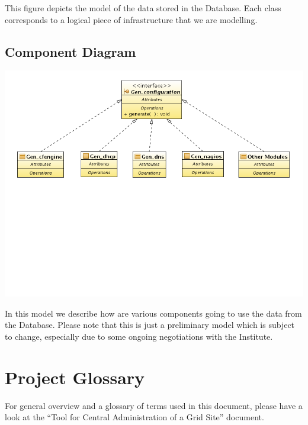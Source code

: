 \documentclass[12pt]{article}
\begin{document}
This figure depicts the model of the data stored in the Database.  Each class
corresponds to a logical piece of infrastructure that we are modelling.

\subsection{Component Diagram}
\includegraphics[width=14cm]{class_diagram_generators.png}

In this model we describe how are various components going to use the data from
the Database.  Please note that this is just a preliminary model which is
subject to change, especially due to some ongoing negotiations with the
Institute.

\section{Project Glossary}

For general overview and a glossary of terms used in this document, please have
a look at the ``Tool for Central Administration of a Grid Site'' document.
\end{document}
